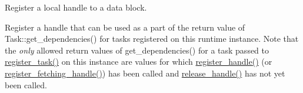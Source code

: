 Register a local handle to a data block. 

Register a handle that can be used as a part of the return value of Task\+::get\+\_\+dependencies() for tasks registered on this runtime instance. Note that the {\itshape only} allowed return values of get\+\_\+dependencies() for a task passed to \hyperlink{classdarma__runtime_1_1abstract_1_1backend_1_1_runtime_aec2382c6822c63ed76f69af1e1f8470b}{register\+\_\+task()} on this instance are values for which \hyperlink{classdarma__runtime_1_1abstract_1_1backend_1_1_runtime_a8c70dc2b90fedd7ae6f090a19b3f694f}{register\+\_\+handle()} (or \hyperlink{classdarma__runtime_1_1abstract_1_1backend_1_1_runtime_acdb81206fe8a663754cf68f44731b35e}{register\+\_\+fetching\+\_\+handle()}) has been called and \hyperlink{classdarma__runtime_1_1abstract_1_1backend_1_1_runtime_a54ba21615ed22638ea23a2a1f03fea02}{release\+\_\+handle()} has not yet been called.


